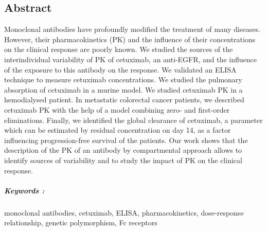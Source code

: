 ﻿\begin{vcenterpage}

\chapter*{Abstract}
Monoclonal antibodies have profoundly modified the treatment of many diseases. However, their pharmacokinetics (PK) and the influence of their concentrations on the clinical response are poorly known. We studied the sources of the interindividual variability of PK of cetuximab, an anti-EGFR, and the influence of the exposure to this antibody on the response. We validated an ELISA technique to measure cetuximab concentrations. We studied the pulmonary absorption of cetuximab in a murine model. We studied cetuximab PK in a hemodialysed patient. In metastatic colorectal cancer patients, we described cetuximab PK with the help of a model combining zero- and first-order eliminations. Finally, we identified the global clearance of cetuximab, a parameter which can be estimated by residual concentration on day 14, as a factor influencing progression-free survival of the patients. Our work shows that the description of the PK of an antibody by compartmental approach allows to identify sources of variability and to study the impact of PK on the clinical response.
\paragraph*{Keywords :} monoclonal antibodies, cetuximab, ELISA, pharmacokinetics, dose-response relationship, genetic polymorphism, Fc receptors

\end{vcenterpage}